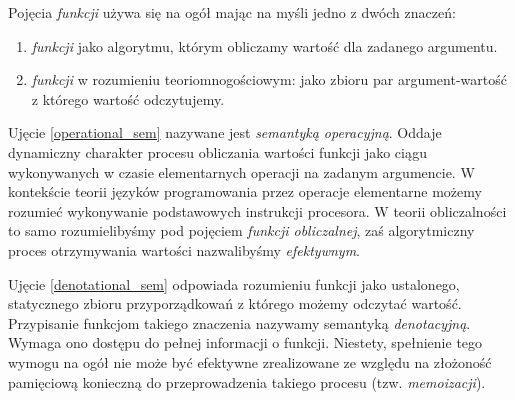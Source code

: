 Pojęcia \emph{funkcji} używa się na ogół mając na myśli jedno z dwóch znaczeń:
\begin{enumerate}[label=(\arabic*)]
  \setlength\itemsep{0em}
  \item \emph{funkcji} jako algorytmu, którym obliczamy wartość dla zadanego argumentu.\label{operational_sem}
  \item \emph{funkcji} w rozumieniu teoriomnogościowym: jako zbioru par argument-wartość z którego wartość odczytujemy.
\label{denotational_sem}
\end{enumerate}
Ujęcie \ref{operational_sem} nazywane jest \emph{semantyką operacyjną}. Oddaje dynamiczny charakter procesu obliczania wartości funkcji jako ciągu wykonywanych w czasie elementarnych operacji na zadanym argumencie. W kontekście teorii języków programowania przez operacje elementarne możemy rozumieć wykonywanie podstawowych instrukcji procesora. W teorii obliczalności to samo rozumielibyśmy pod pojęciem \emph{funkcji obliczalnej}, zaś algorytmiczny proces otrzymywania wartości nazwalibyśmy \emph{efektywnym}.

Ujęcie \ref{denotational_sem} odpowiada rozumieniu funkcji jako ustalonego, statycznego zbioru przyporządkowań z którego możemy odczytać wartość. Przypisanie funkcjom takiego znaczenia nazywamy semantyką \emph{denotacyjną}. Wymaga ono dostępu do pełnej informacji o funkcji. Niestety, spełnienie tego wymogu na ogół nie może być efektywne zrealizowane ze względu na złożoność pamięciową konieczną do przeprowadzenia takiego procesu (tzw. \emph{memoizacji}).
